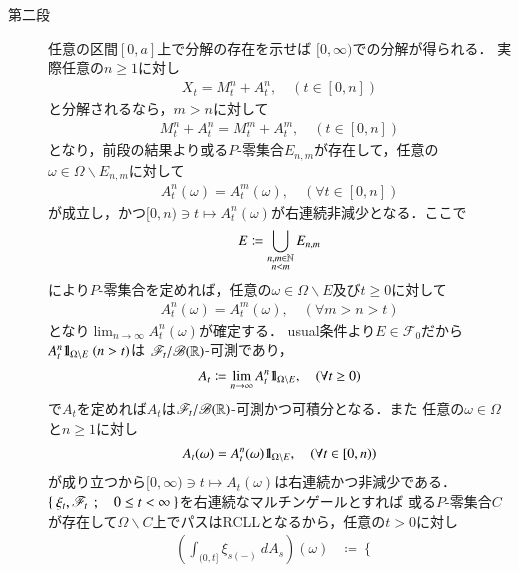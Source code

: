 \begin{prf}
\begin{description}
			\item[第二段]
				任意の区間$[0,a]$上で分解の存在を示せば
				$[0,\infty)$での分解が得られる．
				実際任意の$n \geq 1$に対し
				\begin{align}
					X_t = M^n_t + A^n_t, \quad (t \in [0,n])
				\end{align}
				と分解されるなら，$m > n$に対して
				\begin{align}
					M^n_t + A^n_t = M^m_t + A^m_t, \quad (t \in [0,n])
				\end{align}
				となり，前段の結果より或る$P$-零集合$E_{n,m}$が存在して，任意の$\omega \in \Omega \backslash E_{n,m}$に対して
				\begin{align}
					A^n_t(\omega) = A^m_t(\omega), \quad (\forall t \in [0,n])
				\end{align}
				が成立し，かつ$[0,n) \ni t \longmapsto A^n_t(\omega)$が右連続非減少となる．ここで
				\begin{align}
					E \coloneqq \bigcup_{\substack{n,m \in \mathbb{N} \\ n<m}} E_{n,m}
				\end{align}
				により$P$-零集合を定めれば，任意の$\omega \in \Omega \backslash E$及び$t \geq 0$に対して
				\begin{align}
					A^n_t(\omega) = A^m_t(\omega), \quad (\forall m > n > t)
				\end{align}
				となり$\lim_{n \to \infty} A^n_t(\omega)$が確定する．
				usual条件より$E \in \mathscr{F}_0$だから$A^n_t \mbox{1}\hspace{-0.25em}\mbox{l}_{\Omega \backslash E}\ (n > t)$は
				$\mathscr{F}_t/\mathscr{B}(\mathbb{R})$-可測であり，
				\begin{align}
					A_t \coloneqq  \lim_{n \to \infty} A^n_t \mbox{1}\hspace{-0.25em}\mbox{l}_{\Omega \backslash E},
					\quad (\forall t \geq 0)
				\end{align}
				で$A_t$を定めれば$A_t$は$\mathscr{F}_t/\mathscr{B}(\mathbb{R})$-可測かつ可積分となる．また
				任意の$\omega \in \Omega$と$n \geq 1$に対し
				\begin{align}
					A_t(\omega) = A^n_t(\omega) \mbox{1}\hspace{-0.25em}\mbox{l}_{\Omega \backslash E}, \quad (\forall t \in [0,n))
				\end{align}
				が成り立つから$[0,\infty) \ni t \longmapsto A_t(\omega)$は右連続かつ非減少である．
				$\left\{\ \xi_t,\mathscr{F}_t\ \, ; \quad 0 \leq t < \infty\ \right\}$を右連続なマルチンゲールとすれば
				或る$P$-零集合$C$が存在して$\Omega \backslash C$上でパスはRCLLとなるから，任意の$t > 0$に対し
				\begin{align}
					\left( \int_{(0,t]} \xi_{s(-)}\ dA_s \right)(\omega) &\coloneqq
					\begin{cases}

\end{cases}
\end{align}
\end{description}
\end{prf}
